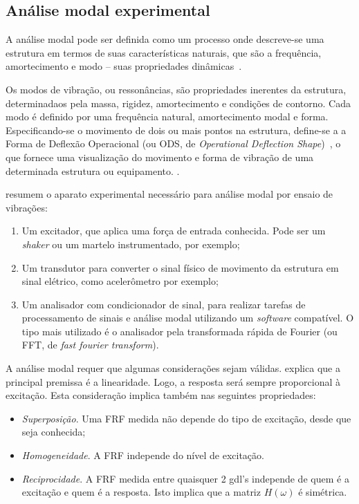 \subsection{Análise modal experimental} \label{sec::modal_analysis}

A análise modal pode ser definida como um processo onde descreve-se uma
estrutura em termos de suas características naturais, que são a frequência,
amortecimento e modo -- suas propriedades
dinâmicas~\cite{avitabile2001experimental}.

Os modos de vibração, ou ressonâncias, são propriedades inerentes da estrutura,
determinadaos pela massa, rigidez, amortecimento e condições de contorno. Cada
modo é definido por uma frequência natural, amortecimento modal e forma.
Especificando-se o movimento de dois ou mais pontos na estrutura, define-se a a
Forma de Deflexão Operacional (ou ODS, de \textit{Operational Deflection
Shape})~\cite{schwarz1999experimental}, o que fornece uma visualização do
movimento e forma de vibração de uma determinada estrutura ou equipamento.
.

\citet{rao2011mechanical} resumem o aparato experimental necessário para análise
modal por ensaio de vibrações:
%
\begin{enumerate}
  \item Um excitador, que aplica uma força de entrada conhecida. Pode ser um
  \textit{shaker} ou um martelo instrumentado, por exemplo;
  \item Um transdutor para converter o sinal físico de movimento da estrutura em
  sinal elétrico, como acelerômetro por exemplo;
  \item Um analisador com condicionador de sinal, para realizar tarefas de
  processamento de sinais e análise modal utilizando um \textit{software} compatível. O tipo mais
  utilizado é o analisador pela transformada rápida de Fourier (ou FFT, de
  \textit{fast fourier transform}). 
\end{enumerate}

A análise modal requer que algumas considerações sejam válidas.
\citet{dossing1988structural} explica que a principal premissa é a linearidade.
Logo, a resposta será sempre proporcional à excitação. Esta consideração implica
também nas seguintes propriedades:
%
\begin{itemize}	
  \item \emph{Superposição}. Uma FRF medida não depende do tipo de excitação, desde que
  seja conhecida;
  \item \emph{Homogeneidade}. A FRF independe do nível de excitação.
  \item \emph{Reciprocidade}. A FRF medida entre quaisquer 2 gdl's independe
  de quem é a excitação e quem é a resposta. Isto implica que a matriz
  $H(\omega)$ é simétrica.
\end{itemize}

